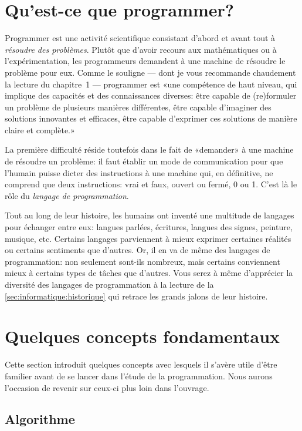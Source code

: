 \section{Qu'est-ce que programmer?}
\label{sec:informatique:programmer}

Programmer est une activité scientifique consistant d'abord et avant
tout à \emph{résoudre des problèmes}. Plutôt que d'avoir recours aux
mathématiques ou à l'expérimentation, les programmeurs demandent à une
machine de résoudre le problème pour eux. Comme le souligne
\citet{Swinnen:python:2012} --- dont je vous recommande chaudement la
lecture du chapitre~1 --- programmer est «une compétence de haut
niveau, qui implique des capacités et des connaissances diverses: être
capable de (re)formuler un problème de plusieurs manières différentes,
être capable d’imaginer des solutions innovantes et efficaces, être
capable d’exprimer ces solutions de manière claire et complète.»

La première difficulté réside toutefois dans le fait de «demander» à
une machine de résoudre un problème: il faut établir un mode de
communication pour que l'humain puisse dicter des instructions à une
machine qui, en définitive, ne comprend que deux instructions: vrai et
faux, ouvert ou fermé, 0 ou 1. C'est là le rôle du \emph{langage de
  programmation}.

Tout au long de leur histoire, les humains ont inventé une multitude
de langages pour échanger entre eux: langues parlées, écritures,
langues des signes, peinture, musique, etc. Certains langages
parviennent à mieux exprimer certaines réalités ou certains sentiments
que d'autres. Or, il en va de même des langages de programmation: non
seulement sont-ils nombreux, mais certains conviennent mieux à
certains types de tâches que d'autres. Vous serez à même d'apprécier
la diversité des langages de programmation à la lecture de la
\autoref{sec:informatique:historique} qui retrace les grands jalons de
leur histoire.


\section{Quelques concepts fondamentaux}
\label{sec:informatique:concepts}

Cette section introduit quelques concepts avec lesquels il s'avère
utile d'être familier avant de se lancer dans l'étude de la
programmation. Nous aurons l'occasion de revenir sur ceux-ci plus loin
dans l'ouvrage.

\subsection{Algorithme}
\label{sec:informatique:concepts:algorithme}

